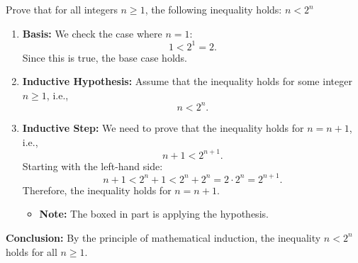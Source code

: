    \begin{example}
        Prove that for all integers \( n \geq 1 \), the following inequality holds: $n < 2^n$

        \begin{enumerate}
            \item \textbf{Basis:} 
            We check the case where \( n = 1 \):
            \[
            1 < 2^1 = 2.
            \]
            Since this is true, the base case holds.

            \item \textbf{Inductive Hypothesis:} 
            Assume that the inequality holds for some integer \( n \geq 1 \), i.e.,
            \[
            n < 2^n.
            \]
            
            \item \textbf{Inductive Step:} 
            We need to prove that the inequality holds for \( n = n+1 \), i.e.,
            \[
            n+1 < 2^{n+1}.
            \]
            Starting with the left-hand side:
            \[
            n+1 < \boxed{2^n} + 1 < 2^n + 2^n = 2 \cdot 2^n = 2^{n+1}.
            \]
            Therefore, the inequality holds for \( n = n+1 \).
            \begin{itemize}
                \item \textbf{Note:} The boxed in part is applying the hypothesis.
            \end{itemize}

        \end{enumerate}

        \textbf{Conclusion:} By the principle of mathematical induction, the inequality \( n < 2^n \) holds for all \( n \geq 1 \).
    \end{example}

